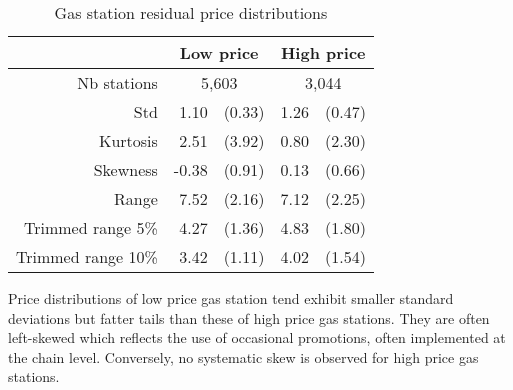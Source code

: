 \documentclass[english]{article}
\begin{document}
\begin{table}[H]
  \caption{Gas station residual price distributions}
	\label{tab:station_price_support_stats_des}
\begin{tabular}{rrrrr}
\hline
\hline
      & \multicolumn{2}{c}{Low price} & \multicolumn{2}{c}{High price} \\
\hline
Nb stations & \multicolumn{2}{c}{5,603} & \multicolumn{2}{c}{3,044} \\
Std   & 1.10  & (0.33) & 1.26  & (0.47) \\
Kurtosis & 2.51  & (3.92) & 0.80  & (2.30) \\
Skewness & -0.38 & (0.91) & 0.13  & (0.66) \\
Range & 7.52  & (2.16) & 7.12  & (2.25) \\
Trimmed range 5\% & 4.27  & (1.36) & 4.83  & (1.80) \\
Trimmed range 10\% & 3.42  & (1.11) & 4.02  & (1.54) \\
\hline
\hline
\end{tabular}
\end{table}

Price distributions of low price gas station tend exhibit smaller standard deviations but fatter tails than these of high price gas stations. They are often left-skewed which reflects the use of occasional promotions, often implemented at the chain level. Conversely, no systematic skew is observed for high price gas stations.
\end{document}
